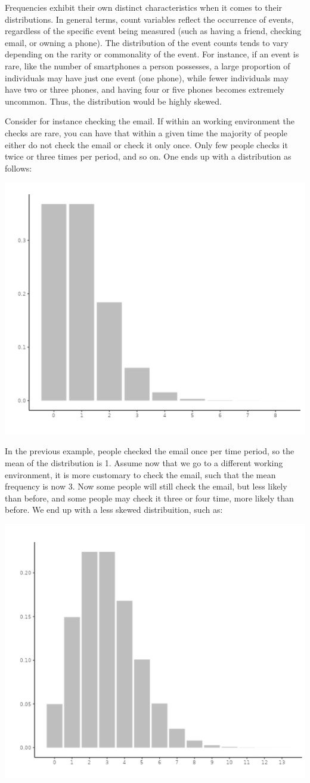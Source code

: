 \documentclass[
]{book}
\begin{document}
Frequencies exhibit their own distinct characteristics when it comes to their distributions. In general terms, count variables reflect the occurrence of events, regardless of the specific event being measured (such as having a friend, checking email, or owning a phone). The distribution of the event counts tends to vary depending on the rarity or commonality of the event. For instance, if an event is rare, like the number of smartphones a person possesses, a large proportion of individuals may have just one event (one phone), while fewer individuals may have two or three phones, and having four or five phones becomes extremely uncommon. Thus, the distribution would be highly skewed.

Consider for instance checking the email. If within an working environment the checks are rare, you can have that within a given time the majority of people either do not check the email or check it only once. Only few people checks it twice or three times per period, and so on. One ends up with a distribution as follows:

\includegraphics[width=0.6\linewidth]{bookletpics/3_poisson_theory1}

In the previous example, people checked the email once per time period, so the mean of the distribution is 1. Assume now that we go to a different working environment, it is more customary to check the email, such that the mean frequency is now 3. Now some people will still check the email, but less likely than before, and some people may check it three or four time, more likely than before. We end up with a less skewed distribuition, such as:

\includegraphics[width=0.6\linewidth]{bookletpics/3_poisson_theory2}
\end{document}
